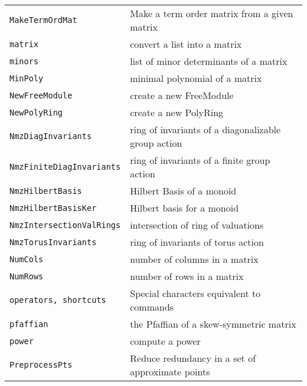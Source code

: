 \documentclass[a4paper]{mybook}
\begin{document}
\begin{center}
\begin{longtable}{ll}
{\verb~MakeTermOrdMat~} &
      Make a term order matrix from a given matrix\\
   
{\verb~matrix~} &
      convert a list into a matrix\\
   
{\verb~minors~} &
      list of minor determinants of a matrix\\
   
{\verb~MinPoly~} &
      minimal polynomial of a matrix\\
   
{\verb~NewFreeModule~} &
      create a new FreeModule\\
   
{\verb~NewPolyRing~} &
      create a new PolyRing\\
   
{\verb~NmzDiagInvariants~} &
      ring of invariants of a diagonalizable group action\\
   
{\verb~NmzFiniteDiagInvariants~} &
      ring of invariants of a finite group action\\
   
{\verb~NmzHilbertBasis~} &
      Hilbert Basis of a monoid\\
   
{\verb~NmzHilbertBasisKer~} &
      Hilbert basis for a monoid\\
   
{\verb~NmzIntersectionValRings~} &
      intersection of ring of valuations\\
   
{\verb~NmzTorusInvariants~} &
      ring of invariants of torus action\\
   
{\verb~NumCols~} &
      number of columns in a matrix\\
   
{\verb~NumRows~} &
      number of rows in a matrix\\
   
{\verb~operators, shortcuts~} &
      Special characters equivalent to commands\\
   
{\verb~pfaffian~} &
      the Pfaffian of a skew-symmetric matrix\\
   
{\verb~power~} &
      compute a power\\
   
{\verb~PreprocessPts~} &
      Reduce redundancy in a set of approximate points\\
   

\end{longtable}
\end{center}
\end{document}
